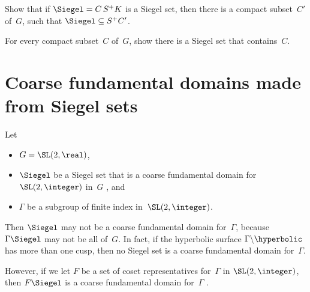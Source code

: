 \begin{exercises}

\item \label{SiegelinS^+C}
Show that if $\Siegel = C \, S^+ K$ is a Siegel set, then there is a compact subset~$C'$ of~$G$, such that $\Siegel \subseteq S^+ C'$.

\item \label{CpctInSiegel}
For every compact subset~$C$ of~$G$, show there is a Siegel set that contains~$C$.

\end{exercises}








\section{Coarse fundamental domains made from Siegel sets} \label{FundFromSiegelSect}


\begin{eg} \label{SiegelNotFundEg}
Let
\noprelistbreak
	\begin{itemize}
	\item $G = \SL(2,\real)$,
	\item $\Siegel$ be a Siegel set that is a coarse fundamental domain for $\SL(2,\integer)$ in~$G$ ,
	and
	\item $\Gamma$ be a subgroup of finite index in~$\SL(2,\integer)$.
	\end{itemize}
Then $\Siegel $ may not be a coarse fundamental domain for~$\Gamma$, because $\Gamma \Siegel$ may not be all of~$G$. In fact, if the hyperbolic surface $\Gamma \backslash \hyperbolic$ has more than one cusp, then no Siegel set is a coarse fundamental domain for~$\Gamma$.

However, if we let $F$ be a set of coset representatives for~$\Gamma$ in $\SL(2,\integer)$, then
	$F \Siegel $
is a coarse fundamental domain for~$\Gamma$ .
\end{eg}

